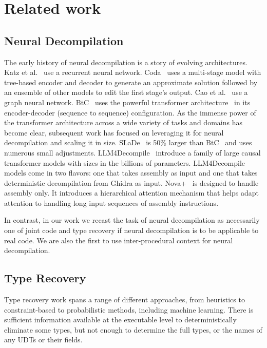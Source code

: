 \section{Related work}
\subsection{Neural Decompilation}

The early history of neural decompilation is a story of evolving architectures.
Katz et al.~\cite{katz2018} use a recurrent neural network.
Coda~\cite{coda} uses a multi-stage model with tree-based encoder and decoder to generate an approximate solution followed by an ensemble of other models to edit the first stage's output.
Cao et al.~\cite{cao2022boosting} use a graph neural network.
BtC~\cite{hosseinibeyond} uses the powerful transformer architecture~\cite{transformer} in its encoder-decoder (sequence to sequence) configuration.
As the immense power of the transformer architecture across a wide variety of tasks and domains has become clear, subsequent work has focused on leveraging it for neural decompilation and scaling it in size.
SLaDe~\cite{slade} is 50\% larger than BtC~\cite{hosseinibeyond} and uses numerous small adjustments.
LLM4Decompile~\cite{llm4decompile} introduce a family of large causal transformer models with sizes in the billions of parameters.
LLM4Decompile models come in two flavors: one that takes assembly as input and one that takes deterministic decompilation from Ghidra as input.
Nova+~\cite{nova} is designed to handle assembly only.
It introduces a hierarchical attention mechanism that helps adapt attention to handling long input sequences of assembly instructions.

In contrast, in our work we recast the task of neural decompilation as necessarily one of joint code and type recovery if neural decompilation is to be applicable to real code.
We are also the first to use inter-procedural context for neural decompilation.

\subsection{Type Recovery}

Type recovery work spans a range of different approaches, from heuristics to constraint-based to probabilistic methods, including machine learning.
There is sufficient information available at the executable level to deterministically eliminate some types, but not enough to determine the full types, or the names of any UDTs or their fields.

